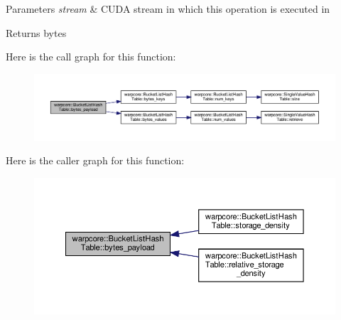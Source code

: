 \begin{DoxyParams}{Parameters}
{\em stream} & C\+U\+DA stream in which this operation is executed in \\
\hline
\end{DoxyParams}
\begin{DoxyReturn}{Returns}
bytes 
\end{DoxyReturn}
Here is the call graph for this function\+:
\nopagebreak
\begin{figure}[H]
\begin{center}
\leavevmode
\includegraphics[width=350pt]{classwarpcore_1_1BucketListHashTable_a3ac40e9655bfc27d3f21e0ea38b3d29d_cgraph}
\end{center}
\end{figure}
Here is the caller graph for this function\+:
\nopagebreak
\begin{figure}[H]
\begin{center}
\leavevmode
\includegraphics[width=350pt]{classwarpcore_1_1BucketListHashTable_a3ac40e9655bfc27d3f21e0ea38b3d29d_icgraph}
\end{center}
\end{figure}
\mbox{\label{classwarpcore_1_1BucketListHashTable_ae650ae236642939884805bdf2f825e2f}} 
